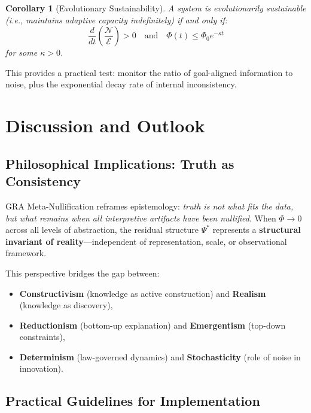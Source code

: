 \documentclass[11pt,a4paper]{article}
\theoremstyle{plain}
\newtheorem{corollary}[theorem]{Corollary}
\theoremstyle{definition}
\theoremstyle{remark}
\newcommand{\NegEntropy}{\mathcal{N}}
\newcommand{\Entropy}{\mathcal{E}}
\newcommand{\Foam}{\Phi}
\begin{document}
\begin{corollary}[Evolutionary Sustainability]
\label{cor:viability}
A system is evolutionarily sustainable (i.e., maintains adaptive capacity indefinitely) if and only if:
\begin{equation}
\boxed{
\frac{d}{dt}\left(\frac{\NegEntropy}{\Entropy}\right) > 0 \quad \text{and} \quad \Foam(t) \leq \Foam_0 e^{-\kappa t}
}
\label{eq:viability}
\end{equation}
for some $\kappa > 0$.
\end{corollary}

\noindent This provides a practical test: monitor the ratio of goal-aligned information to noise, plus the exponential decay rate of internal inconsistency.

\section{Discussion and Outlook}
\label{sec:discussion}

\subsection{Philosophical Implications: Truth as Consistency}

GRA Meta-Nullification reframes epistemology: \textit{truth is not what fits the data, but what remains when all interpretive artifacts have been nullified}. When $\Foam \to 0$ across all levels of abstraction, the residual structure $\Psi^*$ represents a \textbf{structural invariant of reality}---independent of representation, scale, or observational framework.

This perspective bridges the gap between:
\begin{itemize}
    \item \textbf{Constructivism} (knowledge as active construction) and \textbf{Realism} (knowledge as discovery),
    \item \textbf{Reductionism} (bottom-up explanation) and \textbf{Emergentism} (top-down constraints),
    \item \textbf{Determinism} (law-governed dynamics) and \textbf{Stochasticity} (role of noise in innovation).
\end{itemize}

\subsection{Practical Guidelines for Implementation}
\end{document}
